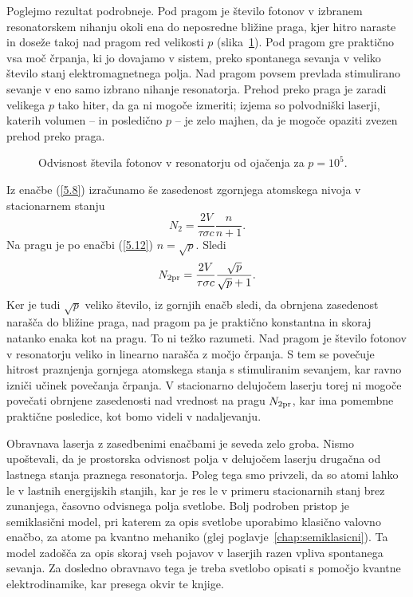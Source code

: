 Poglejmo rezultat podrobneje. Pod pragom je število fotonov v izbranem
resonatorskem nihanju okoli ena do neposredne bližine praga, kjer hitro
naraste in doseže takoj nad pragom red velikosti $p$ (slika~\ref{fig:p}). 
Pod pragom gre praktično vsa moč črpanja, ki jo dovajamo v sistem, 
preko spontanega sevanja v veliko število stanj elektromagnetnega polja. 
Nad pragom povsem prevlada stimulirano sevanje v eno samo izbrano nihanje resonatorja. 
Prehod preko praga je zaradi velikega $p$ tako hiter, da ga ni mogoče izmeriti; 
izjema so polvodniški laserji, katerih volumen -- in posledično $p$ -- je zelo majhen, 
da je mogoče opaziti zvezen prehod preko praga.
\begin{figure}[h]
\centering
\def\svgwidth{70truemm} 

\caption{Odvisnost števila fotonov v resonatorju od ojačenja za $p=10^5$.}
\label{fig:p}
\end{figure}

Iz enačbe (\ref{5.8}) izračunamo še zasedenost zgornjega atomskega
nivoja v stacionarnem stanju
\begin{equation}  
N_2=\frac{2V}{\tau \sigma c}\frac{n}{n+1}.
\label{5.15}
\end{equation}
Na pragu je po enačbi (\ref{5.12}) $n=\sqrt{p}$. 
Sledi 
\begin{equation}  
N_{\rm 2pr}=\frac{2V}{\tau \sigma c}\frac{\sqrt{p}}{\sqrt{p}+1}.
\label{5.16}
\end{equation}
Ker je tudi $\sqrt{p}$ veliko število, iz gornjih enačb sledi, da 
obrnjena zasedenost narašča do bližine praga, nad pragom pa je praktično
konstantna in skoraj natanko enaka kot na pragu. To ni težko razumeti. Nad
pragom je število fotonov v resonatorju veliko in linearno narašča 
z močjo črpanja. S tem se povečuje hitrost praznjenja gornjega atomskega 
stanja s stimuliranim sevanjem, kar ravno izniči učinek povečanja črpanja. 
V stacionarno delujočem laserju torej ni mogoče povečati obrnjene zasedenosti 
nad vrednost na pragu $N_{\rm 2pr}$, kar ima pomembne praktične posledice, kot bomo
videli v nadaljevanju.

\begin{remark}
Obravnava laserja z zasedbenimi enačbami je seveda zelo groba. Nismo
upoštevali, da je prostorska odvisnost polja v delujočem laserju 
drugačna od lastnega stanja praznega resonatorja. Poleg tega smo
privzeli, da so atomi lahko le v lastnih energijskih stanjih, kar je res le
v primeru stacionarnih stanj brez zunanjega, časovno odvisnega polja
svetlobe. Bolj podroben pristop je semiklasični model, pri katerem 
za opis svetlobe uporabimo klasično valovno enačbo, za atome
pa kvantno mehaniko (glej poglavje~\ref{chap:semiklasicni}). Ta model
zadošča za opis skoraj vseh pojavov v laserjih razen vpliva spontanega sevanja. 
Za dosledno obravnavo tega je treba svetlobo opisati s pomočjo 
kvantne elektrodinamike, kar presega okvir te knjige.
\end{remark}

